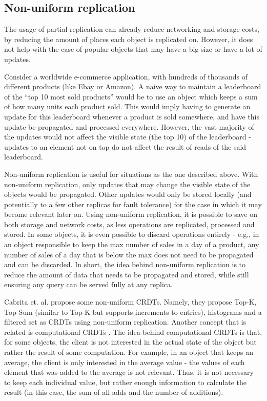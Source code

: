 \subsection{Non-uniform replication}

The usage of partial replication can already reduce networking and storage costs, by reducing the amount of places each object is replicated on.
However, it does not help with the case of popular objects that may have a big size or have a lot of updates.

Consider a worldwide e-commerce application, with hundreds of thousands of different products (like Ebay or Amazon).
A naive way to maintain a leaderboard of the ``top 10 most sold products'' would be to use an object which keeps a sum of how many units each product sold.
This would imply having to generate an update for this leaderboard whenever a product is sold somewhere, and have this update be propagated and processed everywhere.
However, the vast majority of the updates would not affect the visible state (the top 10) of the leaderboard - updates to an element not on top do not affect the result of reads of the said leaderboard.

Non-uniform replication \cite{nonUniform} is useful for situations as the one described above.
With non-uniform replication, only updates that may change the visible state of the objects would be propagated.
Other updates would only be stored locally (and potentially to a few other replicas for fault tolerance) for the case in which it may become relevant later on.
Using non-uniform replication, it is possible to save on both storage and network costs, as less operations are replicated, processed and stored.
In some objects, it is even possible to discard operations entirely \cite{nonUniform} - e.g., in an object responsible to keep the max number of sales in a day of a product, any number of sales of a day that is below the max does not need to be propagated and can be discarded.
In short, the idea behind non-uniform replication is to reduce the amount of data that needs to be propagated and stored, while still ensuring any query can be served fully at any replica.

Cabrita et. al. \cite{nonUniform, nonUniformThesis} propose some non-uniform CRDTs.
Namely, they propose Top-K, Top-Sum (similar to Top-K but supports increments to entries), histograms and a filtered set as CRDTs using non-uniform replication.
Another concept that is related is computational CRDTs \cite{computationalCrdt}.
The idea behind computational CRDTs is that, for some objects, the client is not interested in the actual state of the object but rather the result of some computation.
For example, in an object that keeps an average, the client is only interested in the average value - the values of each element that was added to the average is not relevant.
Thus, it is not necessary to keep each individual value, but rather enough information to calculate the result (in this case, the sum of all adds and the number of additions).

